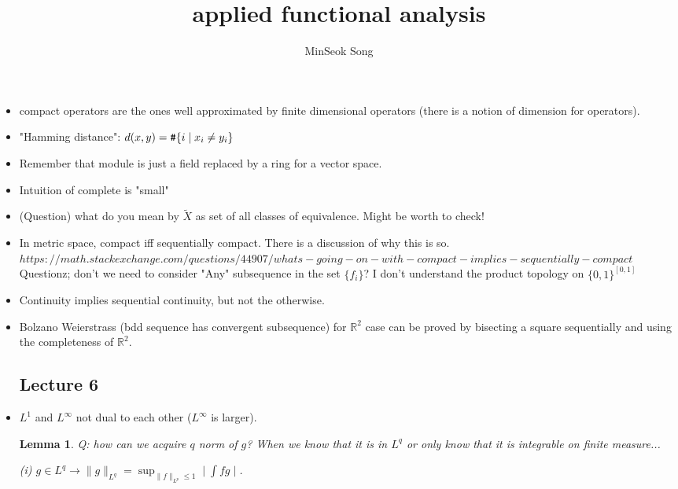 \documentclass{article}
\title{applied functional analysis}
\author{MinSeok Song}
\date{}
\newtheorem{lemma}[theorem]{Lemma}
\theoremstyle{remark}
\begin{document}
\maketitle 
\begin{itemize}
\item compact operators are the ones well approximated by finite dimensional operators (there is a notion of dimension for operators).
\item "Hamming distance": $d(x,y)=\verb|#|\{i\mid x_i\neq y_i\}$
\item Remember that module is just a field replaced by a ring for a vector space.
\item Intuition of complete is "small"
\item (Question) what do you mean by $\tilde X$ as set of all classes of equivalence. Might be worth to check!
\item In metric space, compact iff sequentially compact.
There is a discussion of why this is so. $https://math.stackexchange.com/questions/44907/whats-going-on-with-compact-implies-sequentially-compact$ Questionz; don't we need to consider "Any" subsequence in the set $\{f_i\}$? I don't understand the product topology on $\{0,1\}^{[0,1]}$
\item Continuity implies sequential continuity, but not the otherwise. 
\item Bolzano Weierstrass (bdd sequence has convergent subsequence) for $\mathbb{R}^2$ case can be proved by bisecting a square sequentially and using the completeness of $\mathbb{R}^2$.

\subsection*{Lecture 6}
\item $L^1$ and $L^\infty$ not dual to each other ($L^\infty$ is larger).

\begin{lemma}
Q: how can we acquire $q$ norm of $g$? When we know that it is in $L^q$ or only know that it is integrable on finite measure...

(i) $g\in L^q\to \lVert g\rVert_{L^q}=\sup_{\lVert f\rVert_{L^p}\leq 1}\mid \int fg\mid$.


\end{lemma}
\end{itemize}
\end{document}
